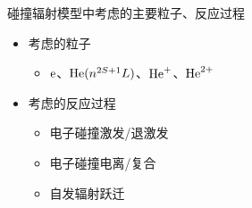 \begin{frame}{碰撞辐射模型中考虑的主要粒子、反应过程}
	\begin{itemize}
		\item 考虑的粒子
		\begin{itemize}
			\item ${\rm e}$、${\rm He}(n^{2S+1}L)$、${\rm He}^+$、${\rm He}^{2+}$
		\end{itemize}
		\bigskip
		\item 考虑的反应过程
		\begin{itemize}
			\item 电子碰撞激发/退激发
			\item 电子碰撞电离/复合
			\item 自发辐射跃迁
		\end{itemize}
	\end{itemize}
\end{frame}

\backupframeend


